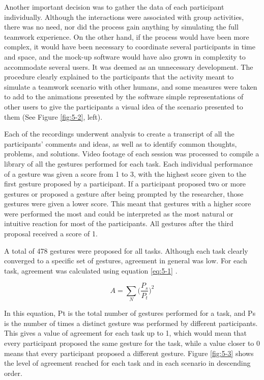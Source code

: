 Another important decision was to gather the data of each participant individually. Although the interactions were associated with group activities, there was no need, nor did the process
gain anything by simulating the full teamwork experience. On the other hand, if the process would have been more complex, it would have been necessary to coordinate several participants in
time and space, and the mock-up software would have also grown in complexity to accommodate several users. It was deemed as an unnecessary development. The procedure clearly explained to
the participants that the activity meant to simulate a teamwork scenario with other humans, and some measures were taken to add to the animations presented by the software simple
representations of other users to give the participants a visual idea of the scenario presented to them (See Figure \ref{fig:5-2}, left).

Each of the recordings underwent analysis to create a transcript of all the participants' comments and ideas, as well as to identify common thoughts, problems, and solutions. Video footage
of each session was processed to compile a library of all the gestures performed for each task. Each individual performance of a gesture was given a score from 1 to 3, with the highest
score given to the first gesture proposed by a participant. If a participant proposed two or more gestures or proposed a gesture after being prompted by the researcher, those gestures were
given a lower score. This meant that gestures with a higher score were performed the most and could be interpreted as the most natural or intuitive reaction for most of the participants.
All gestures after the third proposal received a score of 1.

A total of 478 gestures were proposed for all tasks. Although each task clearly converged to a specific set of gestures, agreement in general was low. For each task, agreement was
calculated using equation \ref{eq:5-1} \parencite{wobbrock_2005}.

\begin{equation}
    A = \sum_{N}^{}\Big(\frac{P_{s}}{P_{t}}\Big)^{2} \label{eq:5-1}
\end{equation}

In this equation, Pt is the total number of gestures performed for a task, and Ps is the number of times a distinct gesture was performed by different participants. This gives a value of
agreement for each task up to 1, which would mean that every participant proposed the same gesture for the task, while a value closer to 0 means that every participant proposed a different
gesture. Figure \ref{fig:5-3} shows the level of agreement reached for each task and in each scenario in descending order.

